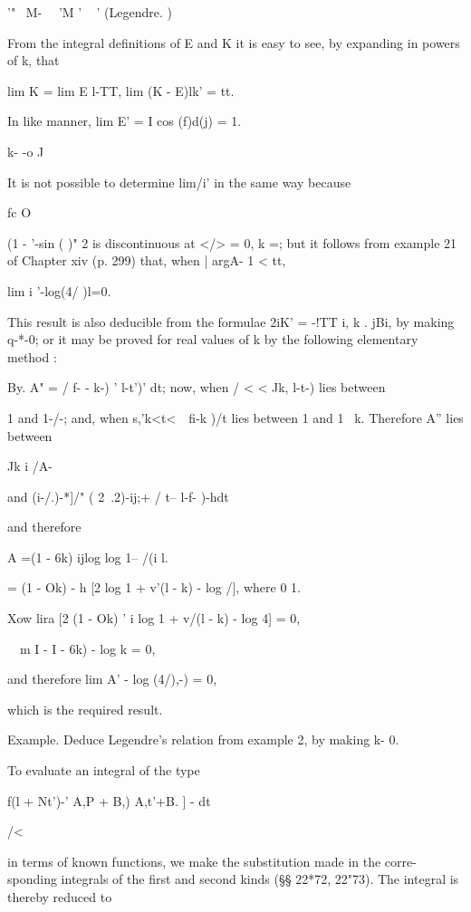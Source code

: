  '" ~M- \ \ 'M ' ~ ' (Legendre. )

From the integral definitions of E and K it is easy to see, by
expanding in powers of k, that

lim K = lim E l-TT, lim (K - E)lk' = tt.

In like manner, lim E' = I cos (f)d(j) = 1.

k- -o J

It is not possible to determine lim/i' in the same way because

fc O

(1 - '-sin ( )" 2 is discontinuous at </> = 0, k =; but it follows
from example 21 of Chapter xiv (p. 299) that, when | argA- 1 < tt,

lim i '-log(4/ )l=0.

%
%

This result is also deducible from the formulae 2iK' = -!TT i, k .
jBi, by making q-*-0; or it may be proved for real values of k by the
following elementary method :

By. A" = / f- - k-) ' l-t')' dt; now, when / < < Jk, l-t-)
lies between

1 and 1-/-; and, when s,'k<t<\ \ fi-k )/t lies between 1 and 1 ~k.
Therefore A'' lies between

Jk i /A-

and (i-/.)-*]/" ( 2\ .2)-ij;+ / t-- l-f- )-hdt\;

and therefore

A =(1 - 6k) ijlog log 1-- /(i l.

= (1 - Ok) - h [2 log 1 + v'(l - k) - log /], where 0 1.

Xow lira [2 (1 - Ok) ' i log 1 + v/(l - k) - log 4] = 0,

\ \ m I - I - 6k) - log k = 0,

and therefore lim A' - log (4/),-) = 0,

which is the required result.

Example. Deduce Legendre's relation from example 2, by making
k- 0.

To evaluate an
integral of the type

f(l + Nt')-' A,P + B,) A,t'+B. ] - dt

/<

in terms of known functions, we make the substitution made in the
corre- sponding integrals of the first and second kinds (§§ 22*72,
22"73). The integral is thereby reduced to

